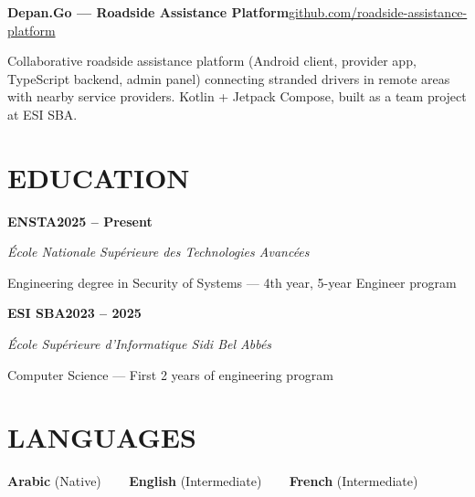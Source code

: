 \documentclass[10.5pt,letterpaper]{article}
\newcommand{\rsection}[1]{\section*{\MakeUppercase{\hspace{0pt}#1}}}
\newcommand{\entryhead}[4]{%
  {\condfont\bfseries\color{ink}\fontsize{10.3}{12}\selectfont #1}\hfill{\bfseries\small\color{accent}#2}\par
  {\itshape\small\color{muted}#3}\hfill{\itshape\small\color{muted}#4}\par
  \vspace{2pt}
}
\newcommand{\entrysimple}[2]{%
  {\condfont\bfseries\color{ink}\fontsize{10.3}{12}\selectfont #1}\hfill{\small\color{muted}#2}\par
}
\begin{document}
\entrysimple{Depan.Go --- Roadside Assistance Platform}{\href{https://github.com/roadside-assistance-platform}{github.com/roadside-assistance-platform}}
\vspace{2pt}
{\small\color{body}Collaborative roadside assistance platform (Android client, provider app, TypeScript backend, admin panel) connecting stranded drivers in remote areas with nearby service providers. Kotlin + Jetpack Compose, built as a team project at ESI SBA.}
\vspace{-4pt}

\rsection{Education}
\entryhead{ENSTA}{2025 -- Present}{École Nationale Supérieure des Technologies Avancées}{}
{\small\color{body}Engineering degree in Security of Systems --- 4th year, 5-year Engineer program}
\vspace{3pt}

\entryhead{ESI SBA}{2023 -- 2025}{École Supérieure d'Informatique Sidi Bel Abb\'es}{}
{\small\color{body}Computer Science --- First 2 years of engineering program}

\rsection{Languages}
{\small\color{body}
\textbf{\color{ink}Arabic} (Native) ~~~
\textbf{\color{ink}English} (Intermediate) ~~~
\textbf{\color{ink}French} (Intermediate)
}
\end{document}
